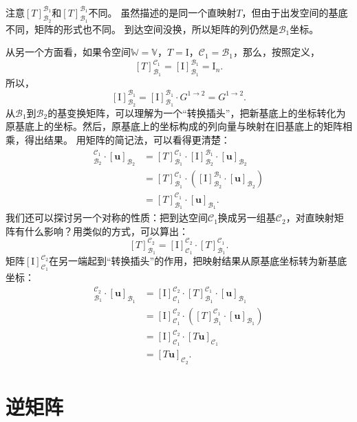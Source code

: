 \documentclass[12pt,UTF8,fontset=none]{ctexbook}
\begin{document}
注意$[T]_{\mathcal{B}_2}^{\mathcal{B}_1}$和$[T]_{\mathcal{B}_1}^{\mathcal{B}_1}$不同。
虽然描述的是同一个直映射$T$，但由于出发空间的基底不同，矩阵的形式也不同。
到达空间没换，所以矩阵的列仍然是$\mathcal{B}_1$坐标。

从另一个方面看，如果令空间$\mathbb{W} = \mathbb{V}$，$T = \mathrm{I}$，$\mathcal{C}_1 = \mathcal{B}_1$，那么，按照定义，
$$[T]_{\mathcal{B}_1}^{\mathcal{C}_1} = [\mathrm{I}]_{\mathcal{B}_1}^{\mathcal{B}_1} = \mathrm{I}_n.$$
所以，
$$[\mathrm{I}]_{\mathcal{B}_2}^{\mathcal{B}_1} = [\mathrm{I}]_{\mathcal{B}_1}^{\mathcal{B}_1} \cdot G^{1\rightarrow 2} = G^{1\rightarrow 2}.$$
从$\mathcal{B}_1$到$\mathcal{B}_2$的基变换矩阵，可以理解为一个“转换插头”，把新基底上的坐标转化为原基底上的坐标。然后，原基底上的坐标构成的列向量与映射在旧基底上的矩阵相乘，得出结果。
用矩阵的简记法，可以看得更清楚：
\begin{align*}
[T]_{\mathcal{B}_2}^{\mathcal{C}_1} \cdot [\mathbf{u}]_{\mathcal{B}_2} &= [T]_{\mathcal{B}_1}^{\mathcal{C}_1} \cdot [\mathrm{I}]_{\mathcal{B}_2}^{\mathcal{B}_1} \cdot [\mathbf{u}]_{\mathcal{B}_2} \\
&= [T]_{\mathcal{B}_1}^{\mathcal{C}_1} \cdot \left([\mathrm{I}]_{\mathcal{B}_2}^{\mathcal{B}_1} \cdot [\mathbf{u}]_{\mathcal{B}_2}\right) \\
&= [T]_{\mathcal{B}_1}^{\mathcal{C}_1} \cdot [\mathbf{u}]_{\mathcal{B}_1}.
\end{align*}
我们还可以探讨另一个对称的性质：把到达空间$\mathcal{C}_1$换成另一组基$\mathcal{C}_2$，对直映射矩阵有什么影响？用类似的方式，可以算出：
$$[T]_{\mathcal{B}_1}^{\mathcal{C}_2} = [\mathrm{I}]_{\mathcal{C}_1}^{\mathcal{C}_2} \cdot [T]_{\mathcal{B}_1}^{\mathcal{C}_1} .$$
矩阵$[\mathrm{I}]_{\mathcal{C}_1}^{\mathcal{C}_2}$在另一端起到“转换插头”的作用，把映射结果从原基底坐标转为新基底坐标：
\begin{align*}
[T]_{\mathcal{B}_1}^{\mathcal{C}_2} \cdot [\mathbf{u}]_{\mathcal{B}_1} &= [\mathrm{I}]_{\mathcal{C}_1}^{\mathcal{C}_2} \cdot [T]_{\mathcal{B}_1}^{\mathcal{C}_1} \cdot [\mathbf{u}]_{\mathcal{B}_1} \\
&= [\mathrm{I}]_{\mathcal{C}_1}^{\mathcal{C}_2} \cdot \left([T]_{\mathcal{B}_1}^{\mathcal{C}_1} \cdot [\mathbf{u}]_{\mathcal{B}_1}\right) \\
&= [\mathrm{I}]_{\mathcal{C}_1}^{\mathcal{C}_2} \cdot [T\mathbf{u}]_{\mathcal{C}_1} \\
&= [T\mathbf{u}]_{\mathcal{C}_2}.
\end{align*}

\section{逆矩阵}
\end{document}
